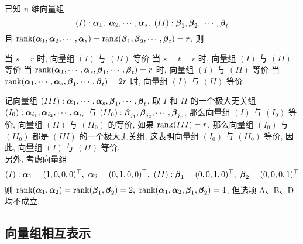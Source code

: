 \begin{example}
    已知 $n$ 维向量组 $$(I):\vb*{\alpha}_1,~\vb*{\alpha}_2,\cdots,\vb*{\alpha}_s,~(II): \vb*{\beta}_1,\vb*{\beta}_2,~\cdots,\vb*{\beta}_t$$
    且 $\rank(\vb*{\alpha}_1,\vb*{\alpha}_2,\cdots,\vb*{\alpha}_s)=\rank(\vb*{\beta}_1,\vb*{\beta}_2,\cdots,\vb*{\beta}_t)=r$, 则 
    \begin{tasks}
        \task 当 $s=r$ 时, 向量组 $(I)$ 与 $(II)$ 等价
        \task 当 $s=t=r$ 时, 向量组 $(I)$ 与 $(II)$ 等价
        \task 当 $\rank(\vb*{\alpha}_1,\cdots,\vb*{\alpha}_s,\vb*{\beta}_1,\cdots,\vb*{\beta}_t)=r$ 时, 向量组 $(I)$ 与 $(II)$ 等价
        \task 当 $\rank(\vb*{\alpha}_1,\cdots,\vb*{\alpha}_s,\vb*{\beta}_1,\cdots,\vb*{\beta}_t)=2r$ 时, 向量组 $(I)$ 与 $(II)$ 等价
    \end{tasks}
\end{example}
\begin{solution}
    记向量组 $(III):\vb*{\alpha}_1,\cdots,\vb*{\alpha}_s,\vb*{\beta}_1,\cdots,\vb*{\beta}_t$, 取 ${I}$ 和 ${II}$ 的一个极大无关组 $(I_0): \vb*{\alpha}_{i_1},\vb*{\alpha}_{i_2},\cdots,\vb*{\alpha}_{i_r}$ 与 $(II_0):\vb*{\beta}_{j_1},\vb*{\beta}_{j_2},\cdots,\vb*{\beta}_{j_r}$, 
    那么向量组 $(I)$ 与 $(I_0)$ 等价, 向量组 $(II)$ 与 $(II_0)$ 的等价, 如果 $\rank(III)=r$, 那么向量组 $(I_0)$ 与 $(II_0)$ 都是 $(III)$ 的一个极大无关组, 这表明向量组 $(I_0)$ 与 $(II_0)$ 等价, 因此, 向量组 $(I)$ 与 $(II)$ 等价.\\
    另外, 考虑向量组 $$(I):\vb*{\alpha}_1=(1,0,0,0)^\top,~\vb*{\alpha}_2=(0,1,0,0)^\top,~(II):\vb*{\beta}_1=(0,0,1,0)^\top,~\vb*{\beta}_2=(0,0,0,1)^\top$$
    则 $\rank(\vb*{\alpha}_1,\vb*{\alpha}_2)=\rank(\vb*{\beta}_1,\vb*{\beta}_2)=2,~\rank(\vb*{\alpha}_1,\vb*{\alpha}_2,\vb*{\beta}_1,\vb*{\beta}_2)=4$, 但选项 A、B、D 均不成立.
\end{solution}

\subsection{向量组相互表示}


